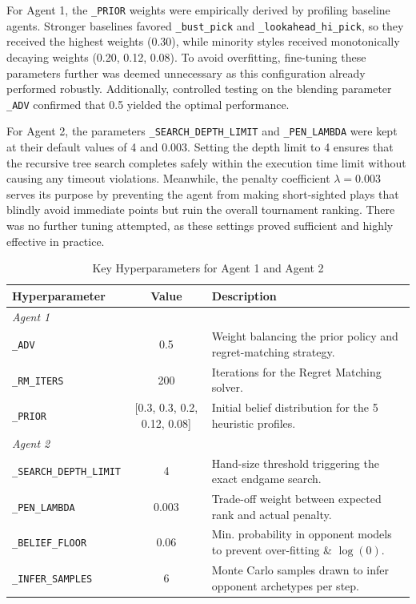 \documentclass{article}
\begin{document}
For Agent 1, the \texttt{\_PRIOR} weights were empirically derived by profiling baseline agents. Stronger baselines favored \texttt{\_bust\_pick} and \texttt{\_lookahead\_hi\_pick}, so they received the highest weights (0.30), while minority styles received monotonically decaying weights (0.20, 0.12, 0.08). To avoid overfitting, fine-tuning these parameters further was deemed unnecessary as this configuration already performed robustly. Additionally, controlled testing on the blending parameter \texttt{\_ADV} confirmed that 0.5 yielded the optimal performance.

For Agent 2, the parameters \texttt{\_SEARCH\_DEPTH\_LIMIT} and \texttt{\_PEN\_LAMBDA} were kept at their default values of 4 and 0.003. Setting the depth limit to 4 ensures that the recursive tree search completes safely within the execution time limit without causing any timeout violations. Meanwhile, the penalty coefficient $\lambda = 0.003$ serves its purpose by preventing the agent from making short-sighted plays that blindly avoid immediate points but ruin the overall tournament ranking. There was no further tuning attempted, as these settings proved sufficient and highly effective in practice.

\begin{table}[h]
\centering

\caption{Key Hyperparameters for Agent 1 and Agent 2}
\label{tab:hyperparams}
\begin{tabular}{lcl}
\hline
\textbf{Hyperparameter} & \textbf{Value} & \textbf{Description} \\
\hline
\multicolumn{3}{l}{\textit{Agent 1 }} \\
\texttt{\_ADV}          & 0.5            & Weight balancing the prior policy and regret-matching strategy. \\
\texttt{\_RM\_ITERS}    & 200            & Iterations for the Regret Matching solver. \\
\texttt{\_PRIOR}        & \small [0.3, 0.3, 0.2, 0.12, 0.08]        & Initial belief distribution for the 5 heuristic profiles. \\
\hline
\multicolumn{3}{l}{\textit{Agent 2 }} \\
\texttt{\_SEARCH\_DEPTH\_LIMIT}& 4              & Hand-size threshold triggering the exact endgame search. \\
\texttt{\_PEN\_LAMBDA}  & 0.003          & Trade-off weight between expected rank and actual penalty. \\
\texttt{\_BELIEF\_FLOOR}& 0.06           & Min. probability in opponent models to prevent over-fitting \& $\log(0)$. \\
\texttt{\_INFER\_SAMPLES}& 6             & Monte Carlo samples drawn to infer opponent archetypes per step. \\
\hline
\end{tabular}
\end{table}
\end{document}
